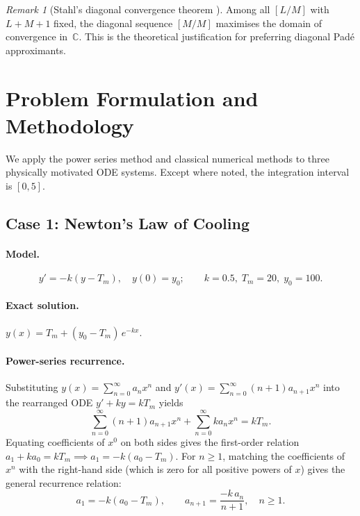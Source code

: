 \documentclass[12pt,a4paper]{article}
\theoremstyle{definition}
\theoremstyle{remark}
\newtheorem{remark}[theorem]{Remark}
\newcommand{\C}{\mathbb{C}}
\begin{document}
\begin{remark}[Stahl's diagonal convergence theorem {\cite{baker1996}}]
  Among all $[L/M]$ with $L + M + 1$ fixed, the diagonal sequence
  $[M/M]$ maximises the domain of convergence in~$\C$.  This is the
  theoretical justification for preferring diagonal Padé approximants.
\end{remark}

\section{Problem Formulation and Methodology}
\label{sec:methods}

We apply the power series method and classical numerical methods to
three physically motivated ODE systems.  Except where noted, the
integration interval is $[0, 5]$.

\subsection{Case 1: Newton's Law of Cooling}
\label{sec:newton}

\paragraph{Model.}
\begin{equation}
  y' = -k(y - T_m), \quad y(0) = y_0;
  \qquad k = 0.5,\; T_m = 20,\; y_0 = 100.
  \label{eq:newton}
\end{equation}
\paragraph{Exact solution.}
$y(x) = T_m + (y_0 - T_m)\,e^{-kx}$.

\paragraph{Power-series recurrence.}
Substituting $y(x) = \sum_{n=0}^{\infty} a_n x^n$ and $y'(x) = \sum_{n=0}^{\infty} (n+1)a_{n+1}x^n$ into the rearranged ODE $y' + ky = k T_m$ yields
\begin{equation}
  \sum_{n=0}^{\infty} (n+1)a_{n+1}x^n + \sum_{n=0}^{\infty} k a_n x^n = k T_m.
\end{equation}
Equating coefficients of $x^0$ on both sides gives the first-order relation $a_1 + k a_0 = k T_m \implies a_1 = -k(a_0 - T_m)$. For $n \geq 1$, matching the coefficients of $x^n$ with the right-hand side (which is zero for all positive powers of $x$) gives the general recurrence relation:
\begin{equation}
  a_1 = -k(a_0 - T_m),
  \qquad
  a_{n+1} = \frac{-k\,a_n}{n+1},\quad n \geq 1.
  \label{eq:newton_rec}
\end{equation}
\end{document}
